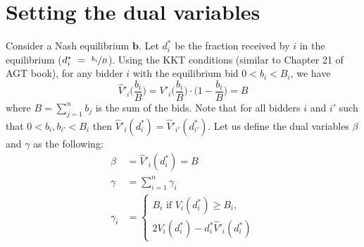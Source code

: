 \documentclass[11pt,a4paper]{article}
\newcommand{\vect}[1]{\ensuremath{\mathbf{#1}}}
\begin{document}
\section{Setting the dual variables}

Consider a Nash equilibrium $\vect{b}$. Let $d_{i}^*$ be the fraction received by $i$ in the equilibrium ($d^{*}_{i}~=~\sfrac{b_{i}}{B}$).
Using the KKT conditions (similar to Chapter 21 of AGT book), for any bidder $i$ with the equilibrium bid $0 < b_{i} < B_{i}$, we have
$$
\hat{V}'_{i}\biggl( \frac{b_{i}}{B} \biggr)
= V'_{i}\biggl( \frac{b_{i}}{B} \biggr) \cdot \biggl( 1 - \frac{b_{i}}{B} \biggr)
= B
$$
where $B = \sum_{j=1}^{n} b_{j}$ is the sum of the bids.
Note that for all bidders $i$ and $i'$ such that $0 < b_{i}, b_{i'} < B_{i}$ then
$ \hat{V}'_{i}(d^{*}_{i})  = \hat{V}'_{i'}(d_{i'}^*)$.
%
Let us define the dual variables $\beta$ and $\gamma$ as the following:
\begin{align*}
	\beta &= \hat{V}'_{i}(d^{*}_{i}) = B\\
	\gamma &= \sum_{i=1}^{n} \gamma_{i}\\
\gamma_{i} &= \begin{cases}
	B_{i} \text{ if } V_{i}(d^{*}_{i}) \geq B_{i}, \\
	2 V_{i}(d^{*}_{i}) -   d^{*}_{i} \hat{V}'_{i}(d^{*}_{i})
\end{cases}
\end{align*}
\end{document}
